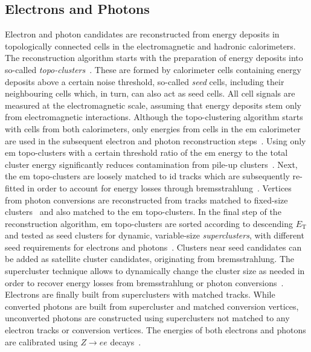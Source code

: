 \subsection{Electrons and Photons}\label{sec:reco_electrons}

Electron and photon candidates are reconstructed from energy deposits in topologically connected cells in the electromagnetic and hadronic calorimeters.
The reconstruction algorithm starts with the preparation of energy deposits into so-called \textit{topo-clusters}~\cite{PERF-2014-07}.
These are formed by calorimeter cells containing energy deposits above a certain noise threshold, so-called \textit{seed} cells, including their neighbouring cells which, in turn, can also act as seed cells.
All cell signals are measured at the electromagnetic scale, assuming that energy deposits stem only from electromagnetic interactions.
Although the topo-clustering algorithm starts with cells from both calorimeters, only energies from cells in the \gls{em} calorimeter are used in the subsequent electron and photon reconstruction steps~\cite{EGAM-2018-01}.
Using only \gls{em} topo-clusters with a certain threshold ratio of the \gls{em} energy to the total cluster energy significantly reduces contamination from pile-up clusters~\cite{EGAM-2018-01}.
Next, the \gls{em} topo-clusters are loosely matched to \gls{id} tracks which are subsequently re-fitted in order to account for energy losses through bremsstrahlung~\cite{EGAM-2018-01}.
Vertices from photon conversions are reconstructed from tracks matched to fixed-size clusters~\cite{PERF-2017-02} and also matched to the \gls{em} topo-clusters.
In the final step of the reconstruction algorithm, \gls{em} topo-clusters are sorted according to descending $E_{\mathrm{T}}$ and tested as seed clusters for dynamic, variable-size \textit{superclusters}, with different seed requirements for electrons and photons~\cite{EGAM-2018-01}.
Clusters near seed candidates can be added as satellite cluster candidates, originating \eg from bremsstrahlung. The supercluster technique allows to dynamically change the cluster size as needed in order to recover energy losses from bremsstrahlung or photon conversions~\cite{EGAM-2018-01}.
Electrons are finally built from superclusters with matched tracks.
While converted photons are built from supercluster and matched conversion vertices, unconverted photons are constructed using superclusters not matched to any electron tracks or conversion vertices.
The energies of both electrons and photons are calibrated using $Z\rightarrow ee$ decays~\cite{EGAM-2018-01}.

